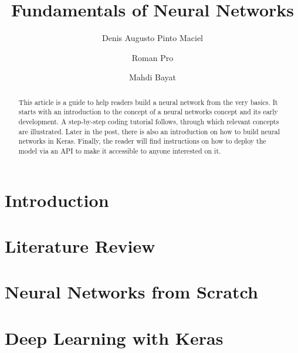 \documentclass[a4paper, 11pt]{article}
\begin{document}
\title{Fundamentals of Neural Networks}

\author[1]{Denis Augusto Pinto Maciel}
\author[1]{Roman Pro}
\author[1]{Mahdi Bayat}


\maketitle

\begin{abstract}
This article is a guide to help readers build a neural network from the very basics. It starts with an introduction to the concept of a neural networks concept and its early development. A step-by-step coding tutorial follows, through which relevant concepts are illustrated. Later in the post, there is also an introduction on how to build neural networks in Keras. Finally, the reader will find instructions on how to deploy the model via an API to make it accessible to anyone interested on it.
\end{abstract}

\section{Introduction}
\label{sec:intro}


\section{Literature Review}


\section{Neural Networks from Scratch}
\label{sec:nn-from-scratch}


\section{Deep Learning with Keras}
\label{sec:keras}


% 

\printbibliography
\end{document}
